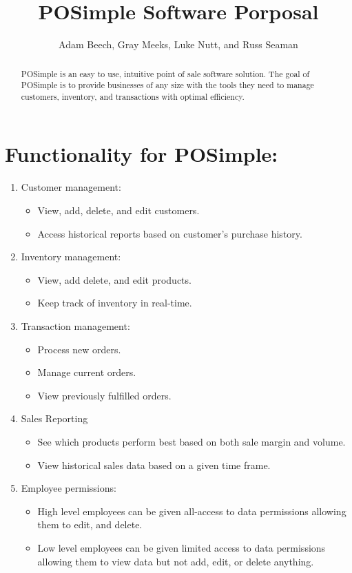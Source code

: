 \documentclass[]{article}
\title{POSimple Software Porposal}
\author{Adam Beech, Gray Meeks, Luke Nutt, and Russ Seaman}
\begin{document}
\maketitle

\begin{abstract}
	POSimple is an easy to use, intuitive point of sale software solution. The goal of POSimple is to provide businesses of any size with the tools they need to manage customers, inventory, and transactions with optimal efficiency.

\end{abstract}

\section{Functionality for POSimple:}
	\begin{enumerate}
		\item Customer management:
		\begin{itemize}
			\item View, add, delete, and edit customers.
			\item Access historical reports based on customer’s purchase history.
		\end{itemize}
		\item Inventory management:
		\begin{itemize}
			\item View, add delete, and edit products.
			\item Keep track of inventory in real-time.
		\end{itemize}
		\item Transaction management:
		\begin{itemize}
			\item Process new orders.
			\item Manage current orders.
			\item View previously fulfilled orders.
		\end{itemize}
		\item Sales Reporting
		\begin{itemize}
			\item See which products perform best based on both sale margin and volume.
			\item View historical sales data based on a given time frame.
		\end{itemize}
		\item Employee permissions:
		\begin{itemize}
			\item High level employees can be given all-access to data permissions allowing them to edit, and delete.
			\item Low level employees can be given limited access to data permissions allowing them to view data but not add, edit, or delete anything.
		\end{itemize}
	\end{enumerate}
\end{document}
